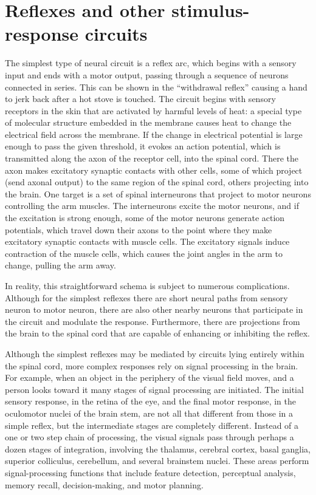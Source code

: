 \hypertarget{reflexes-and-other-stimulus-response-circuits}{%
\section{Reflexes and other stimulus-response circuits}\label{reflexes-and-other-stimulus-response-circuits}}

The simplest type of neural circuit is a reflex arc, which begins with a sensory input and ends with a motor output, passing through a sequence of neurons connected in series. This can be shown in the ``withdrawal reflex'' causing a hand to jerk back after a hot stove is touched. The circuit begins with sensory receptors in the skin that are activated by harmful levels of heat: a special type of molecular structure embedded in the membrane causes heat to change the electrical field across the membrane. If the change in electrical potential is large enough to pass the given threshold, it evokes an action potential, which is transmitted along the axon of the receptor cell, into the spinal cord. There the axon makes excitatory synaptic contacts with other cells, some of which project (send axonal output) to the same region of the spinal cord, others projecting into the brain. One target is a set of spinal interneurons that project to motor neurons controlling the arm muscles. The interneurons excite the motor neurons, and if the excitation is strong enough, some of the motor neurons generate action potentials, which travel down their axons to the point where they make excitatory synaptic contacts with muscle cells. The excitatory signals induce contraction of the muscle cells, which causes the joint angles in the arm to change, pulling the arm away.

In reality, this straightforward schema is subject to numerous complications. Although for the simplest reflexes there are short neural paths from sensory neuron to motor neuron, there are also other nearby neurons that participate in the circuit and modulate the response. Furthermore, there are projections from the brain to the spinal cord that are capable of enhancing or inhibiting the reflex.

Although the simplest reflexes may be mediated by circuits lying entirely within the spinal cord, more complex responses rely on signal processing in the brain. For example, when an object in the periphery of the visual field moves, and a person looks toward it many stages of signal processing are initiated. The initial sensory response, in the retina of the eye, and the final motor response, in the oculomotor nuclei of the brain stem, are not all that different from those in a simple reflex, but the intermediate stages are completely different. Instead of a one or two step chain of processing, the visual signals pass through perhaps a dozen stages of integration, involving the thalamus, cerebral cortex, basal ganglia, superior colliculus, cerebellum, and several brainstem nuclei. These areas perform signal-processing functions that include feature detection, perceptual analysis, memory recall, decision-making, and motor planning.

